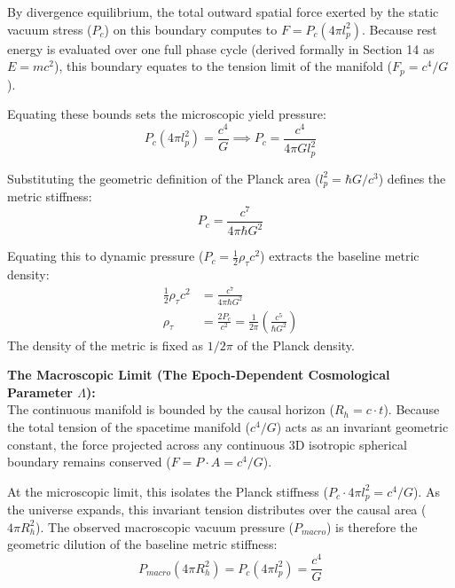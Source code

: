 By divergence equilibrium, the total outward spatial force exerted by the static vacuum stress ($P_c$) on this boundary computes to $F = P_c (4\pi l_p^2)$. Because rest energy is evaluated over one full phase cycle (derived formally in Section 14 as $E = mc^2$), this boundary equates to the tension limit of the manifold ($F_p = c^4 / G$). 

Equating these bounds sets the microscopic yield pressure:
\begin{equation}
    P_c (4\pi l_p^2) = \frac{c^4}{G} \implies P_c = \frac{c^4}{4\pi G l_p^2}
\end{equation}

Substituting the geometric definition of the Planck area ($l_p^2 = \hbar G / c^3$) defines the metric stiffness:
\begin{equation}
    P_c = \frac{c^7}{4\pi \hbar G^2}
\end{equation}

Equating this to dynamic pressure ($P_c = \frac{1}{2}\rho_\tau c^2$) extracts the baseline metric density:
\begin{align}
    \frac{1}{2}\rho_\tau c^2 &= \frac{c^7}{4\pi \hbar G^2} \nonumber \\
    \rho_\tau &= \frac{2 P_c}{c^2} = \frac{1}{2\pi} \left( \frac{c^5}{\hbar G^2} \right) \label{eq:derived_rho_tau}
\end{align}
The density of the metric is fixed as $1/2\pi$ of the Planck density.

\vspace{0.2 cm}

\textbf{The Macroscopic Limit (The Epoch-Dependent Cosmological Parameter $\Lambda$):} \\ 
The continuous manifold is bounded by the causal horizon ($R_h = c\cdot t$). Because the total tension of the spacetime manifold ($c^4/G$) acts as an invariant geometric constant, the force projected across any continuous 3D isotropic spherical boundary remains conserved ($F = P \cdot A = c^4/G$). 

At the microscopic limit, this isolates the Planck stiffness ($P_c \cdot 4\pi l_p^2 = c^4/G$). As the universe expands, this invariant tension distributes over the causal area ($4\pi R_h^2$). The observed macroscopic vacuum pressure ($P_{macro}$) is therefore the geometric dilution of the baseline metric stiffness: 
\begin{equation}
    P_{macro} (4\pi R_h^2) = P_c (4\pi l_p^2) = \frac{c^4}{G}
\end{equation}

